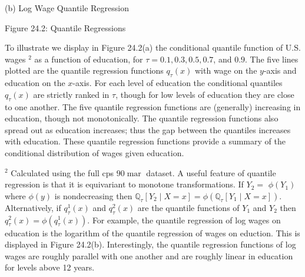 \documentclass[10pt]{article}
\begin{document}
(b) Log Wage Quantile Regression

Figure 24.2: Quantile Regressions

To illustrate we display in Figure 24.2(a) the conditional quantile function of U.S. wages ${ }^{2}$ as a function of education, for $\tau=0.1,0.3,0.5,0.7$, and $0.9$. The five lines plotted are the quantile regression functions $q_{\tau}(x)$ with wage on the $y$-axis and education on the $x$-axis. For each level of education the conditional quantiles $q_{\tau}(x)$ are strictly ranked in $\tau$, though for low levels of education they are close to one another. The five quantile regression functions are (generally) increasing in education, though not monotonically. The quantile regression functions also spread out as education increases; thus the gap between the quantiles increases with education. These quantile regression functions provide a summary of the conditional distribution of wages given education.

${ }^{2}$ Calculated using the full cps $90 \operatorname{mar}$ dataset. A useful feature of quantile regression is that it is equivariant to monotone transformations. If $Y_{2}=$ $\phi\left(Y_{1}\right)$ where $\phi(y)$ is nondecreasing then $\mathbb{Q}_{\tau}\left[Y_{2} \mid X=x\right]=\phi\left(\mathbb{Q}_{\tau}\left[Y_{1} \mid X=x\right]\right)$. Alternatively, if $q_{\tau}^{1}(x)$ and $q_{\tau}^{2}(x)$ are the quantile functions of $Y_{1}$ and $Y_{2}$ then $q_{\tau}^{2}(x)=\phi\left(q_{\tau}^{1}(x)\right)$. For example, the quantile regression of log wages on education is the logarithm of the quantile regression of wages on eduction. This is displayed in Figure 24.2(b). Interestingly, the quantile regression functions of log wages are roughly parallel with one another and are roughly linear in education for levels above 12 years.
\end{document}
